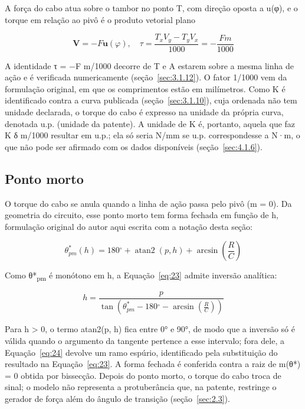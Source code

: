 A força do cabo atua sobre o tambor no ponto T, com direção oposta a u(φ), e o torque em relação ao pivô é o produto vetorial plano

\begin{equation}
  \mathbf{V} = - F\mathbf{u}(\varphi),\quad\tau = \frac{T_{x}V_{y} - T_{y}V_{x}}{1000} = - \frac{Fm}{1000}
  \label{eq:22}
\end{equation}

A identidade τ = −F m/1000 decorre de T e A estarem sobre a mesma linha de ação e é verificada numericamente (seção~\ref{sec:3.1.12}). O fator 1/1000 vem da formulação original, em que os comprimentos estão em milímetros. Como K é identificado contra a curva publicada (seção~\ref{sec:3.1.10}), cuja ordenada não tem unidade declarada, o torque do cabo é expresso na unidade da própria curva, denotada u.p. (unidade da patente). A unidade de K é, portanto, aquela que faz K δ m/1000 resultar em u.p.; ela só seria N/mm se u.p. correspondesse a N·m, o que não pode ser afirmado com os dados disponíveis (seção~\ref{sec:4.1.6}).

\subsection{Ponto morto}\label{sec:3.1.7}

O torque do cabo se anula quando a linha de ação passa pelo pivô (m = 0). Da geometria do circuito, esse ponto morto tem forma fechada em função de h, formulação original do autor aqui escrita com a notação desta seção:

\begin{equation}
  \theta_{pm}^{*}(h) = 180{^\circ} + \operatorname{atan2}{(p,h)} + \arcsin\left( \frac{R}{C} \right)
  \label{eq:23}
\end{equation}

Como θ*\textsubscript{pm} é monótono em h, a Equação~\eqref{eq:23} admite inversão analítica:

\begin{equation}
  h = \frac{p}{\tan\left( \theta_{pm}^{*} - 180{^\circ} - \arcsin\left( \frac{R}{C} \right) \right)}
  \label{eq:24}
\end{equation}

Para h > 0, o termo atan2(p, h) fica entre 0° e 90°, de modo que a inversão só é válida quando o argumento da tangente pertence a esse intervalo; fora dele, a Equação~\eqref{eq:24} devolve um ramo espúrio, identificado pela substituição do resultado na Equação~\eqref{eq:23}. A forma fechada é conferida contra a raiz de m(θ*) = 0 obtida por bissecção. Depois do ponto morto, o torque do cabo troca de sinal; o modelo não representa a protuberância que, na patente, restringe o gerador de força além do ângulo de transição (seção~\ref{sec:2.3}).

